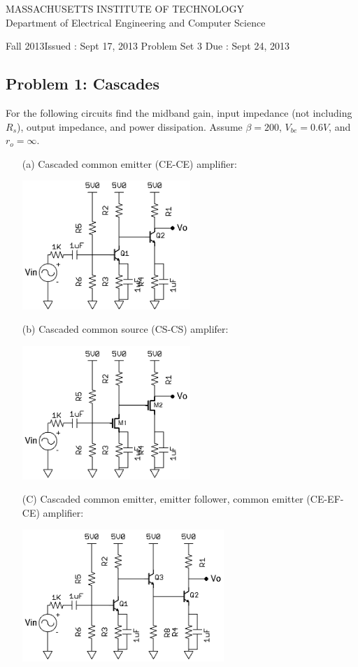 \documentclass[11pt,twoside]{article}
\newlength{\toppush}
\newcommand{\htitle}[3]{\begin{center}
\vspace*{-\toppush}
{\large MASSACHUSETTS INSTITUTE OF TECHNOLOGY}\\
{\small Department of Electrical Engineering and Computer Science}\\
\vspace*{1ex}{\Large #2}\end{center}
\noindent
\newline\parbox{6.5in}
{Fall 2013\hfill Issued : #1 \newline
 Problem Set 3 \hfill Due : #3\newline
}}
\newcommand{\handout}[3]{\thispagestyle{empty}
\pagestyle{myheadings}\htitle{#1}{#2}{#3}}
\begin{document}
\handout{Sept 17, 2013}{6.301 Solid State Circuits}{Sept 24, 2013}
\setlength{\parindent}{0pt}

\newcommand{\solution}{
 \medskip
 {\bf Solution:}
}

\hrulefill

\flushleft

\subsection*{Problem 1: Cascades}
	For the following circuits find the midband gain, input impedance (not including $R_s$), output impedance, and power dissipation.  Assume $\beta=200$, $V_{be} = 0.6V$, and $r_o=\infty$.
\begin{enumerate}
	\item[(a)] Cascaded common emitter (CE-CE) amplifier:

\begin{center}
\includegraphics[width=0.5\textwidth]{ce-ce.png}
\end{center}
	\item[(b)] Cascaded common source (CS-CS) amplifer:
\begin{center}
\includegraphics[width=0.5\textwidth]{cs-cs.png}
\end{center}
\clearpage
	\item[(C)] Cascaded common emitter, emitter follower, common emitter (CE-EF-CE) amplifier:
\begin{center}
\includegraphics[width=0.6\textwidth]{ce-ef-ce.png}
\end{center}
\end{enumerate}
\end{document}
